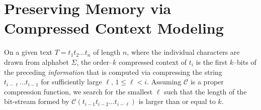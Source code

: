 \documentclass[runningheads,a4paper]{llncs}
\begin{document}
\section{Preserving Memory via Compressed Context Modeling}

On a given text $T=t_1t_2 \ldots t_n$ of length $n$, where the individual characters are drawn from alphabet
$\Sigma$, the order--$k$ compressed context of $t_i$ is the first $k$--bits of the preceding \emph{information} 
that is computed via compressing the string $t_{i-\ell} \ldots t_{i-1}$ for sufficiently large $\ell$,
$1 \leq \ell < i$. 
Assuming $\mathcal{C}$ is a proper compression function, we search for the smallest $\ell$ such that 
the length of the bit-stream formed by $\mathcal{C}(t_{i-1}t_{i-2} \ldots t_{i-\ell})$ is larger than or equal to $k$. 
\end{document}
